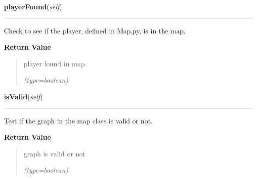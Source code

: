 \hspace{.8\funcindent}\begin{boxedminipage}{\funcwidth}

    \raggedright \textbf{playerFound}(\textit{self})

    \vspace{-1.5ex}

    \rule{\textwidth}{0.5\fboxrule}
\setlength{\parskip}{2ex}
    Check to see if the player, defined in Map.py, is in the map.

\setlength{\parskip}{1ex}
      \textbf{Return Value}
    \vspace{-1ex}

      \begin{quote}
      player found in map

      {\it (type=boolean)}

      \end{quote}

    \end{boxedminipage}

    \label{UnBlockMe:Map:Map:Map:isValid}

    \vspace{0.5ex}

\hspace{.8\funcindent}\begin{boxedminipage}{\funcwidth}

    \raggedright \textbf{isValid}(\textit{self})

    \vspace{-1.5ex}

    \rule{\textwidth}{0.5\fboxrule}
\setlength{\parskip}{2ex}
    Test if the graph in the map class is valid or not.

\setlength{\parskip}{1ex}
      \textbf{Return Value}
    \vspace{-1ex}

      \begin{quote}
      graph is valid or not

      {\it (type=boolean)}

      \end{quote}

    \end{boxedminipage}

    \label{UnBlockMe:Map:Map:Map:validAdditionMoves}

